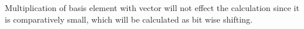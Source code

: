 Multiplication of basis element with vector will not effect the calculation since it is comparatively small, which will be calculated as bit wise shifting.


